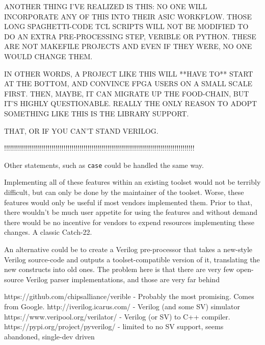 \documentclass[conference,compsoc]{IEEEtran}
\begin{document}
ANOTHER THING I'VE REALIZED IS THIS: NO ONE WILL INCORPORATE ANY OF THIS INTO THEIR ASIC WORKFLOW.
THOSE LONG SPAGHETTI-CODE TCL SCRIPTS WILL NOT BE MODIFIED TO DO AN EXTRA PRE-PROCESSING STEP,
VERIBLE OR PYTHON. THESE ARE NOT MAKEFILE PROJECTS AND EVEN IF THEY WERE, NO ONE WOULD CHANGE
THEM.

IN OTHER WORDS, A PROJECT LIKE THIS WILL **HAVE TO** START AT THE BOTTOM, AND CONVINCE FPGA
USERS ON A SMALL SCALE FIRST. THEN, MAYBE, IT CAN MIGRATE UP THE FOOD-CHAIN, BUT IT'S HIGHLY
QUESTIONABLE. REALLY THE ONLY REASON TO ADOPT SOMETHING LIKE THIS IS THE LIBRARY SUPPORT.

THAT, OR IF YOU CAN'T STAND VERILOG.

!!!!!!!!!!!!!!!!!!!!!!!!!!!!!!!!!!!!!!!!!!!!!!!!!!!!!!!!!!!!!!!!!!!!!!!!!!!!!!!!!!!!!!!!!!!!!!!!

Other statements, such as {\tt case} could be handled the same way.

Implementing all of these features within an existing toolset would not be
terribly difficult, but can only be done by the maintainer of the toolset.
Worse, these features would only be useful if most vendors implemented them.
Prior to that, there wouldn't be much user appetite for using the features
and without demand there would be no incentive for vendors to expend resources
implementing these changes. A classic Catch-22.

An alternative could be to create a Verilog pre-processor that takes
a new-style Verilog source-code and outputs a toolset-compatible version of it,
translating the new constructs into old ones. The problem here is that there are
very few open-source Verilog parser implementations, and those are very far
behind

https://github.com/chipsalliance/verible - Probably the most promising. Comes from Google.
http://iverilog.icarus.com/ - Verilog (and some SV) simulator
https://www.veripool.org/verilator/ - Verilog (or SV) to C++ compiler.
https://pypi.org/project/pyverilog/ - limited to no SV support, seems abandoned, single-dev driven


%
%
\end{document}
